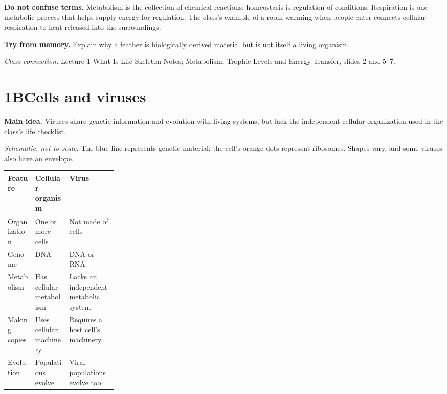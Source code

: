 \documentclass[11pt,letterpaper]{article}
\newcommand{\pagechapter}[2]{\clearpage\section*{#1}\phantomsection\label{#2}\addcontentsline{toc}{section}{#1}}
\newcommand{\idea}[1]{\textbf{Main idea.} #1\par}
\newcommand{\memorycheck}[1]{\par\smallskip\textbf{Try from memory.} #1\par}
\newcommand{\classsource}[1]{{\footnotesize\textit{Class connection:} #1\par}}
\begin{document}
\textbf{Do not confuse terms.} Metabolism is the collection of chemical reactions; homeostasis is regulation of conditions. Respiration is one metabolic process that helps supply energy for regulation. The class's example of a room warming when people enter connects cellular respiration to heat released into the surroundings.
\memorycheck{Explain why a feather is biologically derived material but is not itself a living organism.}
\classsource{Lecture 1 What Is Life Skeleton Notes; Metabolism, Trophic Levels and Energy Transfer, slides 2 and 5--7.}

\pagechapter{1B\quad Cells and viruses}{cells}
\idea{Viruses share genetic information and evolution with living systems, but lack the independent cellular organization used in the class's life checklist.}
\begin{center}
\par
\end{center}
\textit{Schematic, not to scale.} The blue line represents genetic material; the cell's orange dots represent ribosomes. Shapes vary, and some viruses also have an envelope.
\par
\begin{tabularx}{\linewidth}{@{}p{0.25\linewidth}Y Y@{}}\toprule
Feature & Cellular organism & Virus\\\midrule
Organization & One or more cells & Not made of cells\\
Genome & DNA & DNA or RNA\\
Metabolism & Has cellular metabolism & Lacks an independent metabolic system\\
Making copies & Uses cellular machinery & Requires a host cell's machinery\\
Evolution & Populations evolve & Viral populations evolve too\\\bottomrule
\end{tabularx}\par
\end{document}
